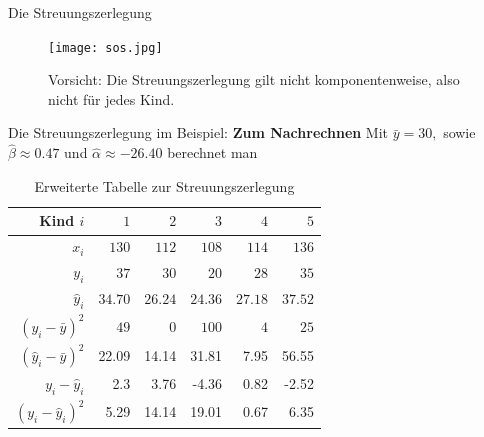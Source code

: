 \documentclass[usenames,dvipsnames,handout]{beamer}
\begin{document}
\begin{frame}{Die Streuungszerlegung}
\begin{figure}[ht]
 	\centering
 	      \texttt{[image: sos.jpg]}%
 	      \caption{Vorsicht: Die Streuungszerlegung gilt nicht komponentenweise,
 	      also nicht für jedes Kind.}
 	\end{figure}
\end{frame}
 \begin{frame}{Die Streuungszerlegung im Beispiel: \textbf{Zum Nachrechnen}}
 Mit $\bar{y}=30,$ sowie $\hat{\beta}\approx 0.47$ und $\hat{\alpha} \approx -26.40$ berechnet man
  \begin{table}[h]
 \centering 
\begin{tabular}{|r|r|r|r|r|r|}
  \hline%
  Kind   $i$     &   $1$    & $2$   & $3$   & $4$   & $5$ \\ \hline
   $x_{i}$ & $130$ & $112$ & $108$ & $114$ & $136$  \\ \hline
    $y_{i}$ & $37$& $30$ & $20$&  $28$ & $35$ \\ \hline
    $\hat{y}_{i}$ & $34.70$ & $26.24$ & $24.36$ & $27.18$ & $37.52$  \\ \hline
    $(y_{i}-\bar{y})^{2}$ & $49$& $0$ & $100$&  $4$ & $25$ \\ \hline
    $(\hat{y}_{i}-\bar{y})^{2}$ & 22.09 & 14.14 & 31.81 &  7.95 &56.55 \\ \hline
    $y_{i}-\hat{y}_{i}$ & 2.3 & 3.76 & -4.36 &  0.82 &-2.52 \\ \hline%
    $(y_{i}-\hat{y}_{i})^{2}$ & 5.29 & 14.14 & 19.01 &  0.67 &6.35 \\ \hline %
  \end{tabular}
 \caption{Erweiterte Tabelle zur Streuungszerlegung}
 \end{table}  
 \end{frame}
 
 
\end{document}
